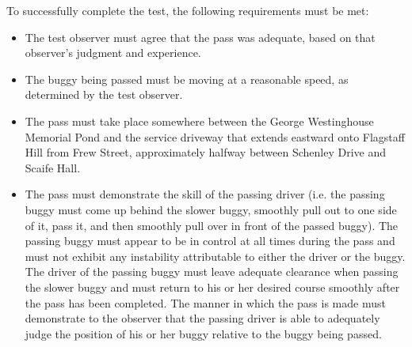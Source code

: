 	\noindent To successfully complete the test, the following requirements must be met:

	\begin{itemize}

		\item The test observer must agree that the pass was adequate, based on
		that observer's judgment and experience.

		\item The buggy being passed must be moving at a reasonable speed, as
		determined by the test observer.

		\item The pass must take place somewhere between the George Westinghouse
		Memorial Pond and the service driveway that extends eastward onto Flagstaff
		Hill from Frew Street, approximately halfway between Schenley Drive and Scaife
		Hall.

		\item The pass must demonstrate the skill of the passing driver (i.e. the
		passing buggy must come up behind the slower buggy, smoothly pull out to one
		side of it, pass it, and then smoothly pull over in front of the passed buggy).
		The passing buggy must appear to be in control at all times during the pass and
		must not exhibit any instability attributable to either the driver or the
		buggy. The driver of the passing buggy must leave adequate clearance when
		passing the slower buggy and must return to his or her desired course smoothly
		after the pass has been completed. The manner in which the pass is made must
		demonstrate to the observer that the passing driver is able to adequately judge
		the position of his or her buggy relative to the buggy being passed.

	\end{itemize}


